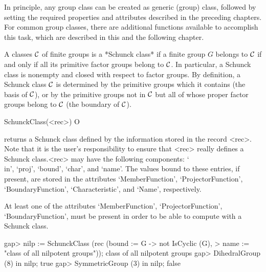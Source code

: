 
In principle, any group class can be created as generic (group) class,
followed by setting the required properties and attributes described in the
preceding chapters. For common group classes, there are additional functions
available to accomplish this task, which are described in this and the
following chapter.



A classes $\cal C$ of finite groups is a *Schunck class* if a finite group
$G$ belongs to $\cal C$ if and only if all its primitive factor groups
belong to $\cal C$. In particular, a Schunck class is nonempty and closed
with respect to factor groups. By definition, a Schunck class $\cal C$ is
determined by the primitive groups which it contains (the basis of $\cal C$),
or by the primitive groups not in $\cal C$ but all of whose proper factor
groups belong to $\cal C$ (the boundary of $\cal C$).

\>SchunckClass(<rec>) O

returns a Schunck class defined by the information stored in the record
<rec>. Note that it is the user's responsibility to ensure that <rec> really
defines a Schunck class.<rec> may have the following components: `\\in',
`proj', `bound', `char', and `name'. The values bound to these entries, if
present, are stored in the attributes `MemberFunction', `ProjectorFunction',
`BoundaryFunction', `Characteristic', and `Name', respectively.

At least one of the attributes `MemberFunction', `ProjectorFunction', 
`BoundaryFunction', must be present in order to be able to compute
with a Schunck class. 

\beginexample
gap> nilp := SchunckClass (rec (bound := G -> not IsCyclic (G),
>        name := "class of all nilpotent groups"));
class of all nilpotent groups
gap> DihedralGroup (8) in nilp;
true
gap> SymmetricGroup (3) in nilp;
false
\endexample


